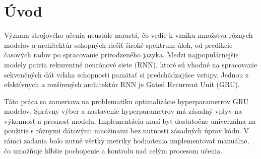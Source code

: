 \setcounter{page}{1}
\setcounter{equation}{0}
\setcounter{figure}{0}
\setcounter{table}{0}

\section*{Úvod}
Význam strojového učenia neustále narastá, čo vedie k vzniku množstva rôznych modelov a architektúr schopných riešiť široké spektrum úloh, od predikcie časových radov po spracovanie prirodzeného jazyka. Medzi najpopulárnejšie modely patria rekurentné neurónové siete (RNN), ktoré sú vhodné na spracovanie sekvenčných dát vďaka schopnosti pamätať si predchádzajúce vstupy. Jednou z efektívnych a rozšírených architektúr RNN je Gated Recurrent Unit (GRU).

Táto práca sa zameriava na problematiku optimalizácie hyperparametrov GRU modelov. Správny výber a nastavenie hyperparametrov má zásadný vplyv na výkonnosť a presnosť modelu. Implementácia musí byť dostatočne univerzálna na použitie s rôznymi dátovými množinami bez nutnosti zásadných úprav kódu. V rámci zadania bolo nutné všetky metriky hodnotenia implementovať manuálne, čo umožňuje hlbšie pochopenie a kontrolu nad celým procesom učenia.
